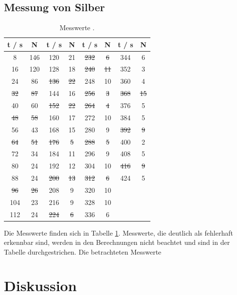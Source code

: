 \subsection{Messung von Silber}
\begin{table}
  \centering
  \begin{tabular}{c c | c c | c c | c c}
    \toprule
    t / \si{\second} & N & t / \si{\second} & N & t / \si{\second} & N & t / \si{\second} & N \\
    \midrule
    8 & 146 & 120 & 21 & \sout{232} & \sout{6} & 344 & 6 \\
    16 & 120 & 128 & 18 & \sout{240} & \sout{11} & 352 & 3 \\
    24 & 86 & \sout{136} & \sout{22} & 248 & 10 & 360 & 4 \\
    \sout{32} & \sout{87} & 144 & 16 & \sout{256} & \sout{3} & \sout{368} & \sout{15} \\
    40 & 60 & \sout{152} & \sout{22} & \sout{264} & \sout{4} & 376 & 5 \\
    \sout{48} & \sout{58} & 160 & 17 & 272 & 10 & 384 & 5\\
    56 & 43 & 168 & 15 & 280 & 9 & \sout{392} & \sout{9}\\
    \sout{64} & \sout{51} & \sout{176} & \sout{5} & \sout{288} & \sout{5} & 400 & 2 \\
    72 & 34 & 184 & 11 & 296 & 9 & 408 & 5 \\
    80 & 24 & 192 & 12 & 304 & 10 & \sout{416} & \sout{9} \\
    88 & 24 & \sout{200} & \sout{13} & \sout{312} & \sout{6} & 424 & 5 \\
    \sout{96} & \sout{26} & 208 & 9 & 320 & 10 & & \\
    104 & 23 & 216 & 9 & 328 & 10 & & \\
    112 & 24 & \sout{224} & \sout{6} & 336 & 6 & & \\
    \bottomrule
  \end{tabular}
  \caption{Messwerte .}
  \label{tab:2}
\end{table}
Die Messwerte finden sich in Tabelle \ref{tab:2}. Messwerte, die deutlich als fehlerhaft
erkennbar sind, werden in den Berechnungen nicht beachtet und sind in der Tabelle
durchgestrichen. Die betrachteten Messwerte 

\section{Diskussion}

\newpage
\nocite{*}
\printbibliography
